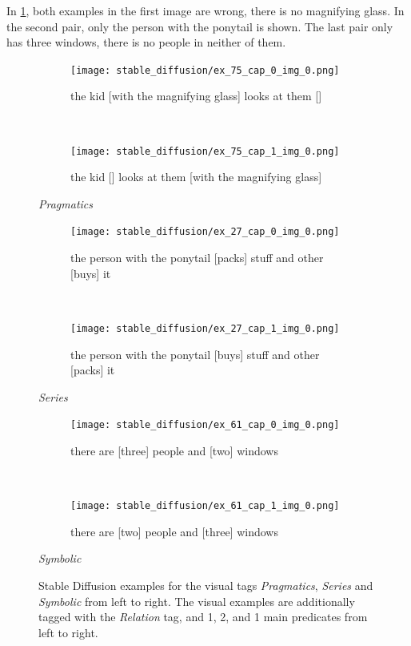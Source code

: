 In \cref{fig:stable-diffusion-examples-visual}, both examples in the first image are wrong, there is no magnifying glass. In the second pair, only the person with the ponytail is shown. The last pair only has three windows, there is no people in neither of them.

\begin{figure}[ht]
\centering
    \begin{minipage}{.30\textwidth}
        \begin{subfigure}{\textwidth}
        \centering
        \texttt{[image: stable\_diffusion/ex\_75\_cap\_0\_img\_0.png]}
        \caption{the kid [with the magnifying glass] looks at them []}
        \end{subfigure}\\
        \begin{subfigure}{\textwidth}
        \centering
        \texttt{[image: stable\_diffusion/ex\_75\_cap\_1\_img\_0.png]}
        \caption{the kid [] looks at them [with the magnifying glass]}
        \end{subfigure}%
        \caption*{\textit{Pragmatics}}
    \end{minipage}
    \hfill
    \begin{minipage}{.30\textwidth}
        \begin{subfigure}{\textwidth}
        \centering
        \texttt{[image: stable\_diffusion/ex\_27\_cap\_0\_img\_0.png]}
        \caption{the person with the ponytail [packs] stuff and other [buys] it}
        \end{subfigure}\\
        \begin{subfigure}{\textwidth}
        \centering
        \texttt{[image: stable\_diffusion/ex\_27\_cap\_1\_img\_0.png]}
        \caption{the person with the ponytail [buys] stuff and other [packs] it}
        \end{subfigure}%
        \caption*{\textit{Series}}
    \end{minipage}
    \hfill
    \begin{minipage}{.30\textwidth}
        \begin{subfigure}{\textwidth}
        \centering
        \texttt{[image: stable\_diffusion/ex\_61\_cap\_0\_img\_0.png]}
        \caption{there are [three] people and [two] windows}
        \end{subfigure}\\
        \begin{subfigure}{\textwidth}
        \centering
        \texttt{[image: stable\_diffusion/ex\_61\_cap\_1\_img\_0.png]}
        \caption{there are [two] people and [three] windows}
        \end{subfigure}%
        \caption*{\textit{Symbolic}}
    \end{minipage}
    \caption{Stable Diffusion examples for the visual tags \textit{Pragmatics}, \textit{Series} and \textit{Symbolic} from left to right. The visual examples are additionally tagged with the \textit{Relation} tag, and 1, 2, and 1 main predicates from left to right.}
    \label{fig:stable-diffusion-examples-visual}
\end{figure}

